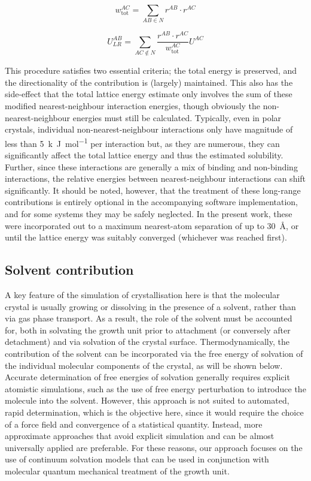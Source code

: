 \documentclass[twoside,twocolumn,9pt]{article}
\begin{document}
\begin{equation}
    w_{\textrm{tot}}^{AC} = \sum_{AB \in N} r^{AB} \cdot r^{AC}
\end{equation}

\begin{equation}
    U_{LR}^{AB} = \sum_{AC \notin N} \frac{r^{AB} \cdot r^{AC}}{w_{\textrm{tot}}^{AC}} U^{AC}
\end{equation}

This procedure satisfies two essential criteria; the total energy is preserved, and the directionality of the contribution is (largely) maintained. This also has the side-effect that the total lattice energy estimate only involves the sum of these modified nearest-neighbour interaction energies, though obviously the non-nearest-neighbour energies must still be calculated. Typically, even in polar crystals, individual non-nearest-neighbour interactions only have magnitude of less than \qty{5}{k.J.mol^{-1}} per interaction but, as they are numerous, they can significantly affect the total lattice energy and thus the estimated solubility.
Further, since these interactions are generally a mix of binding and non-binding interactions, the relative energies between nearest-neighbour interactions can shift significantly.
It should be noted, however, that the treatment of these long-range contributions is entirely optional in the accompanying software implementation, and for some systems they may be safely neglected. In the present work, these were incorporated out to a maximum nearest-atom separation of up to 30~\r{A}, or until the lattice energy was suitably converged (whichever was reached first).

\subsection{Solvent contribution}
A key feature of the simulation of crystallisation here is that the molecular crystal is usually growing or dissolving in the presence of a solvent, rather than via gas phase transport. As a result, the role of the solvent must be accounted for, both in solvating the growth unit prior to attachment (or conversely after detachment) and via solvation of the crystal surface. Thermodynamically, the contribution of the solvent can be incorporated via the free energy of solvation of the individual molecular components of the crystal, as will be shown below. Accurate determination of free energies of solvation generally requires explicit atomistic simulations, such as the use of free energy perturbation to introduce the molecule into the solvent.\cite{Jorgensen2008} However, this approach is not suited to automated, rapid determination, which is the objective here, since it would require the choice of a force field and convergence of a statistical quantity. Instead, more approximate approaches that avoid explicit simulation and can be almost universally applied are preferable. For these reasons, our approach focuses on the use of continuum solvation models that can be used in conjunction with molecular quantum mechanical treatment of the growth unit.\cite{Tomasi2005}
\end{document}
